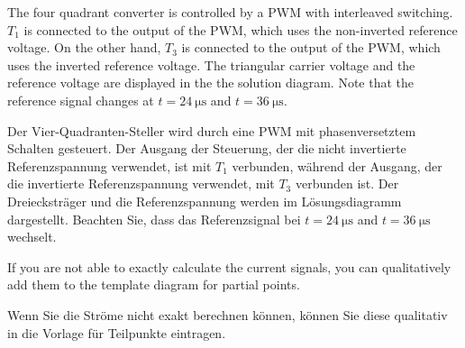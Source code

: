 The four quadrant converter is controlled by a PWM with interleaved switching. $T_1$ is connected to the  output of the PWM, 
which uses the non-inverted reference voltage. On the other hand, $T_3$ is connected to the output of the PWM, 
which uses the inverted reference voltage.
The triangular carrier voltage and the reference voltage are displayed in the the solution diagram.
Note that the reference signal changes at $t=\SI{24}{\micro\second}$ and $t=\SI{36}{\micro\second}$.

\vspace{1em}
\color{gray}
Der Vier-Quadranten-Steller wird durch eine PWM mit phasenversetztem Schalten gesteuert.
Der Ausgang der Steuerung, der die nicht invertierte Referenzspannung verwendet, ist mit $T_1$ verbunden, während der Ausgang, der die invertierte Referenzspannung verwendet, mit $T_3$ verbunden ist.
Der Dreiecksträger und die Referenzspannung werden im Lösungsdiagramm dargestellt.
Beachten Sie, dass das Referenzsignal bei $t=\SI{24}{\micro\second}$ and $t=\SI{36}{\micro\second}$ wechselt.
\color{black}


 
\begin{hintblock}
    If you are not able to exactly calculate the current signals, you can qualitatively add them to the template diagram for partial points.
\end{hintblock}

\begin{germanhintblock}
    Wenn Sie die Ströme nicht exakt berechnen können, können Sie diese qualitativ in die Vorlage für Teilpunkte eintragen.
\end{germanhintblock}

